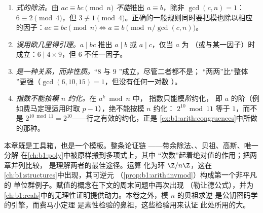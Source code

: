 \begin{remark}[算术中的常见陷阱]\label{rem:b1:arith:pitfalls}
\begin{enumerate}
  \item \emph{式的除法。}由 $ac \equiv bc \pmod n$
        \emph{不能}推出 $a \equiv b$，除非 $\gcd(c,
        n) = 1$：$6 \equiv 2 \pmod 4$，但 $3 \not\equiv 1 \pmod
        4$。正确的一般规则同时要把模也除以相应的因子：$ac
        \equiv bc \pmod n \iff a \equiv b \pmod{n/\gcd(c,n)}$。
  \item \emph{误用欧几里得引理。}$a \mid bc$ 推出 $a
        \mid b$ 或 $a \mid c$，仅当 $a$ 为\emph{}
        （或与某一因子）时成立：$6 \mid 4 \times 9$，但 $6$
        不任一因子。
  \item \emph{是一种关系，而非性质。}“$8$ 与
        $9$ ”成立，尽管二者都不是；
        “两两”比“整体
        ”更强（$\gcd(6, 10, 15) = 1$，但没有任何一对数
        ）。
  \item \emph{指数不能按模 $n$ 约化。}在 $a^k \bmod n$ 中，
        指数只能模\emph{阶}约化，
        即 $a$ 的阶（例如费马定理适用时取 $p - 1$），绝不能按模 $n$ 约化：
        $2^{10} \bmod 11$ 等于 $1$，而不是 $2^{10 \bmod
        11} = 2^{10}$——行之有效的约化，正是
        \cref{ex:b1:arith:congruences}中所做的那种。
\end{enumerate}
\end{remark}

\begin{remark}[本章的用途]\label{rem:b1:arith:whereused}
本章既是工具箱，也是一个模板。整条论证链
——带余除法、、贝祖、高斯、唯一分解
在\cref{ch:b1:poly}中被原样搬到多项式上，其中
“次数”起着绝对值的作用；把两章并列比较，
是理解两者的最佳途径。运算
化为环 $\Z/n\Z$，这在
\cref{ch:b1:structures}中出现，其可逆元
（\cref{prop:b1:arith:invmod}）构成第一个非平凡的
单位群例子。赋值的概念在下文的周末问题中再次出现
（勒让德公式），并为
\cref{ch:b1:reals}中的无理性证明提供动力。本卷之外，模 $n$ 的贝祖求逆
是公钥密码学的引擎，而费马小定理
是素性检验的鼻祖，这些检验用来认证
此处所用的大。
\end{remark}

